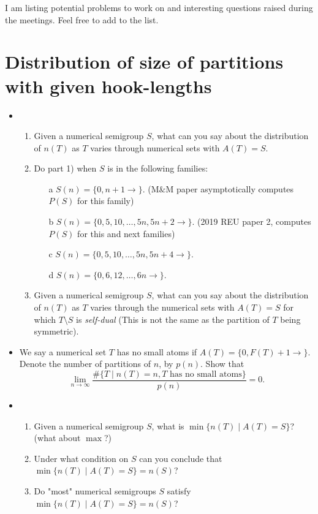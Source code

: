 \documentclass{article}
\theoremstyle{definition}
\theoremstyle{definition}
\theoremstyle{definition}
\begin{document}
I am listing potential problems to work on and interesting questions raised during the meetings. Feel free to add to the list.

\section{Distribution of size of partitions with given hook-lengths}
\begin{itemize}
    \item 
    \begin{enumerate}
    \item Given a numerical semigroup $S$, what can you say about the distribution of $n(T)$ as $T$ varies through numerical sets with $A(T)=S$.
    \item Do part 1) when $S$ is in the following families:
    \begin{enumerate}
        \item[a] $S(n)=\{0,n+1\rightarrow\}$. (M$\&$M paper asymptotically computes $P(S)$ for this family)
        \item[b] $S(n)=\{0,5,10,\dots,5n,5n+2\rightarrow\}$. (2019 REU paper 2, computes $P(S)$ for this and next families)
        \item[c] $S(n)=\{0,5,10,\dots,5n,5n+4\rightarrow\}$.
        \item[d] $S(n)=\{0,6,12,\dots,6n\rightarrow\}$.
    \end{enumerate}
    \item Given a numerical semigroup $S$, what can you say about the distribution of $n(T)$ as $T$ varies through the numerical sets with $A(T)=S$ for which $T\setminus S$ is \emph{self-dual} (This is not the same as the partition of $T$ being symmetric).
\end{enumerate}
    \item We say a numerical set $T$ has no small atoms if $A(T)=\{0,F(T)+1\rightarrow\}$. Denote the number of partitions of $n$, by $p(n)$. Show that
    \[\lim_{n\to\infty} \frac{\#\{T\mid n(T)=n, T \text{ has no small atoms}\}}{p(n)}=0.\]
    \item
    \begin{enumerate}
        \item Given a numerical semigroup $S$, what is $\min\{n(T)\mid A(T)=S\}$? (what about $\max$?)
        \item Under what condition on $S$ can you conclude that $\min\{n(T)\mid A(T)=S\}=n(S)$?
        \item Do "most" numerical semigroups $S$ satisfy $\min\{n(T)\mid A(T)=S\}=n(S)$?

\end{enumerate}
\end{itemize}
\end{document}
